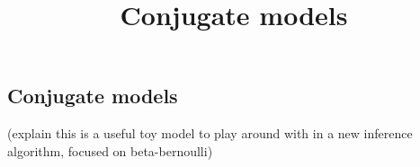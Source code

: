 \title{Conjugate models}

\subsection{Conjugate models}

(explain this is a useful toy model to play
    around with in a new inference algorithm, focused on
    beta-bernoulli)
